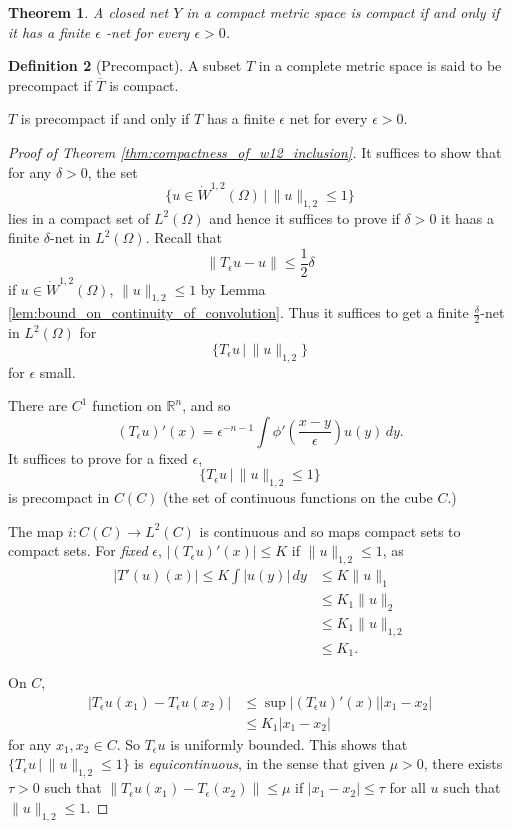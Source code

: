 \documentclass[10pt, oneside, reqno]{amsart}
\theoremstyle{plain}%
\newtheorem{thm}{Theorem}[section]
\numberwithin{equation}{section}
\theoremstyle{definition}
\newtheorem{defn}[thm]{Definition}
\theoremstyle{remark}
\newcommand{\given}{ \, | \,}
\newcommand{\R}{\mathbb{R}}
\begin{document}
\begin{thm}
    A closed net $Y$ in a compact metric space is compact if and only if it has a finite $\epsilon$ -net for every $\epsilon > 0$. 
\end{thm}

\begin{defn}[Precompact]
    A subset $T$ in a complete metric space is said to be precompact if $\overline T$ is compact.  
    
    $T$ is precompact if and only if $T$ has a finite $\epsilon$ net for every $\epsilon > 0$.
\end{defn}

\begin{proof}[Proof of Theorem \ref{thm:compactness_of_w12_inclusion}]
    It suffices to show that for any $\delta > 0$, the set \[
        \{ u \in \dot W^{1, 2}(\Omega) \given \| u \|_{1, 2} \leq 1 \}
    \]  lies in a compact set of $L^2(\Omega)$ and hence it suffices to prove if $\delta > 0$ it haas a finite $\delta$-net in $L^2(\Omega)$.   Recall that \[
        \| T_\epsilon u - u \| \leq \frac{1}{2}\delta
    \]  if $u \in \dot W^{1, 2}(\Omega)$, $\| u \|_{1, 2} \leq 1$ by Lemma \ref{lem:bound_on_continuity_of_convolution}.  Thus it suffices to get a finite $\frac{\delta}{2}$-net in $L^2(\Omega)$ for \[
        \{ T_\epsilon u \given \| u \|_{1, 2} \}
    \] for $\epsilon$ small.
    
    There are $C^1$ function on $\R^n$, and so \[
        (T_\epsilon u)' (x) = \epsilon^{-n-1} \int \phi' \left(\frac{x-y}{\epsilon} \right) u(y) \, dy.
        \tag{$\star$}
    \] It suffices to prove for a fixed $\epsilon$, \[
        \{ T_\epsilon u \given \| u \|_{1, 2} \leq 1 \}
    \] is precompact in $C(C)$ (the set of continuous functions on the cube $C$.)
    
    The map $i : C(C) \rightarrow L^2(C)$ is continuous and so maps compact sets to compact sets.  For \emph{fixed} $\epsilon$, $\left| (T_\epsilon u)' (x) \right| \leq K$ if $\| u \|_{1, 2} \leq 1$, as \begin{align*}
        |T'(u)(x)| \leq K \int |u(y) | \, dy &\leq K \| u \|_1\\
        &\leq K_1 \|u \|_2 \\
        &\leq K_1 \| u \|_{1, 2} \\
        &\leq K_1.
    \end{align*}  
    
    On $C$, 
    \begin{align*}
        |T_\epsilon u(x_1) - T_\epsilon u(x_2)| &\leq \sup |(T_\epsilon u)'(x)| |x_1 - x_2| \\
        &\leq K_1 |x_1 - x_2|
    \end{align*} for any $x_1, x_2 \in C$.  So $T_\epsilon u$ is uniformly bounded. This shows that $\{ T_\epsilon u \given \| u \|_{1, 2} \leq 1 \}$ is \emph{equicontinuous}, in the sense that given $\mu > 0$, there exists $\tau > 0$ such that $\| T_\epsilon u(x_1) - T_\epsilon(x_2) \| \leq \mu$ if $|x_1 - x_2| \leq \tau$ for all $u$ such that $\| u \|_{1, 2} \leq 1$.
    

\end{proof}
\end{document}
